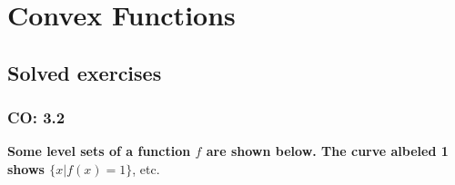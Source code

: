 \section{Convex Functions}
\subsection{Solved exercises}
\subsubsection{CO: 3.2}
\textbf{Some level sets of a function $f$ are shown below. The curve albeled 1 shows $\{x | f(x) = 1\}$}, etc.


